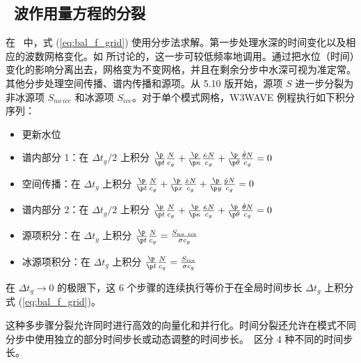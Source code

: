 \noindent

\vssub
\subsection{~波作用量方程的分裂} \label{sec:basic_num}
\vsssub

在 \ws\ 中，式 (\ref{eq:bal_f_grid}) 使用分步法求解。第一步处理水深的时间变化以及相应的波数网格变化。如 \cite{tol:GAOS98b} 所讨论的，这一步可较低频率地调用。通过把水位（时间）变化的影响分离出去，网格变为不变网格，并且在剩余分步中水深可视为准定常。其他分步处理空间传播、谱内传播和源项。从 5.10 版开始，源项 $S$ 进一步分裂为非冰源项 $S_{no~ice}$ 和冰源项 $S_{ice}$。对于单个模式网格，{\code W3WAVE} 例程执行如下积分序列：
\begin{itemize}
 \item[1.] 更新水位
 \item[2.] 谱内部分 1：在 $\Delta t_g/2$ 上积分 $\frac{\p}{\p t} \frac{N}{c_g} + \frac{\p}{\p \kappa} \frac{\dot{\kappa} N}{c_g} + \frac{\p}{\p \theta} \frac{\dot{\theta} N}{c_g}  =0 $
 \item[3.] 空间传播：在 $\Delta t_g$ 上积分 $\frac{\p}{\p t} \frac{N}{c_g} +  
\frac{\p}{\p x} \frac{\dot{x} N}{c_g} + 
\frac{\p}{\p y} \frac{\dot{y} N}{c_g}  = 0$
 \item[4.] 谱内部分 2：在 $\Delta t_g/2$ 上积分 $\frac{\p}{\p t} \frac{N}{c_g} + \frac{\p}{\p \kappa} \frac{\dot{\kappa} N}{c_g} + \frac{\p}{\p \theta} \frac{\dot{\theta} N}{c_g}  =0 $
 \item[5.] 源项积分：在 $\Delta t_g$ 上积分 $\frac{\p}{\p t} \frac{N}{c_g}   = \frac{S_{no~ice}}{\sigma c_g}$
 \item[6.] 冰源项积分：在 $\Delta t_g$ 上积分 $\frac{\p}{\p t} \frac{N}{c_g}   = \frac{S_{ice}}{\sigma c_g}$
\end{itemize}
在 $\Delta t_g \rightarrow 0$ 的极限下，这 6 个步骤的连续执行等价于在全局时间步长 $\Delta t_g$ 上积分式 (\ref{eq:bal_f_grid})。

这种多步骤分裂允许同时进行高效的向量化和并行化。时间分裂还允许在模式不同分步中使用独立的部分时间步长或动态调整的时间步长。\ws\ 区分 4 种不同的时间步长。\label{dt_list}


